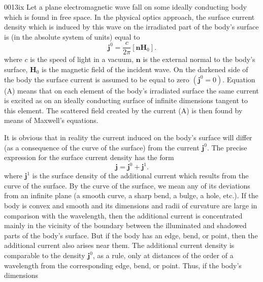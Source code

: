 \begin{scanpage}{0013}{ix}
Let a plane electromagnetic wave fall on some ideally conducting body which is found in free space. In the physical optics approach, the surface current density which is induced by this wave on the irradiated part of the body's surface is (in the absolute system of units) equal to
\[\mathbf j^0=\frac c{2\pi}[\mathbf n\mathbf H_0].\tag{A}\]
where $c$ is the speed of light in a vacuum, $\mathbf n$ is the external normal to the body's surface, $\mathbf H_0$ is the magnetic field of the incident wave. On the darkened side of the body the surface current is assumed to be equal to zero $(\mathbf j^0=0)$. Equation (A) means that on each element of the body's irradiated surface the same current is excited as on an ideally conducting surface of infinite dimensions tangent to this element. The scattered field created by the current (A) is then found by means of Maxwell's equations.

It is obvious that in reality the current induced on the body's surface will differ (as a consequence of the curve of the surface) from the current $\mathbf j^0$. The precise expression for the surface current density has the form
\[\mathbf j=\mathbf j^0+\mathbf j^1.\tag{B}\]
where $\mathbf j^1$ is the surface density of the additional current which results from the curve of the surface. By the curve of the surface, we mean any of its deviations from an infinite plane (a smooth curve, a sharp bend, a bulge, a hole, etc.). If the body is convex and smooth and its dimensions and radii of curvature are large in comparison with the wavelength, then the additional current is concentrated mainly in the vicinity of the boundary between the illuminated and shadowed parts of the body's surface. But if the body has an edge, bend, or point, then the additional current also arises near them. The additional current density is comparable to the density $\mathbf j^0$, as a rule, only at distances of the order of a wavelength from the corresponding edge, bend, or point. Thus, if the body's dimensions
\end{scanpage}
